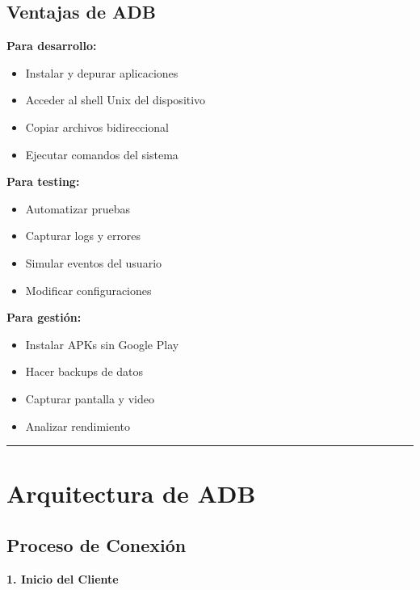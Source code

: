 \documentclass[
  doc,
  floatsintext,
  longtable,
  a4paper,
  nolmodern,
  notxfonts,
  notimes,
  12pt,
  colorlinks=true,linkcolor=blue,citecolor=blue,urlcolor=blue]{apa7}
\providecommand{\tightlist}{%
  \setlength{\itemsep}{0pt}\setlength{\parskip}{0pt}}
\begin{document}
\subsection{Ventajas de ADB}\label{ventajas-de-adb}

\textbf{Para desarrollo:}

\begin{itemize}
\tightlist
\item
  Instalar y depurar aplicaciones
\item
  Acceder al shell Unix del dispositivo
\item
  Copiar archivos bidireccional
\item
  Ejecutar comandos del sistema
\end{itemize}

\textbf{Para testing:}

\begin{itemize}
\tightlist
\item
  Automatizar pruebas
\item
  Capturar logs y errores
\item
  Simular eventos del usuario
\item
  Modificar configuraciones
\end{itemize}

\textbf{Para gestión:}

\begin{itemize}
\tightlist
\item
  Instalar APKs sin Google Play
\item
  Hacer backups de datos
\item
  Capturar pantalla y video
\item
  Analizar rendimiento
\end{itemize}

\begin{center}\rule{0.5\linewidth}{0.5pt}\end{center}

\section{Arquitectura de ADB}\label{arquitectura-de-adb}

\subsection{Proceso de Conexión}\label{proceso-de-conexiuxf3n}

\textbf{1. Inicio del Cliente}
\end{document}
